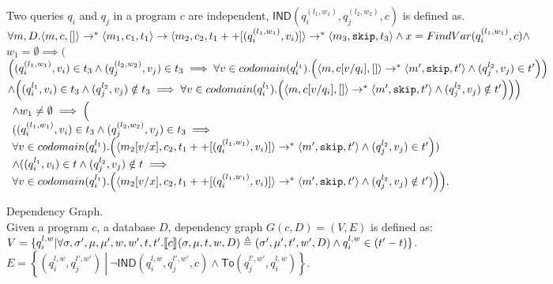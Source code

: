 \documentclass[a4paper,11pt]{article}
\begin{document}
\begin{defn}
Two queries $q_i$ and $q_j$ in a program $c$ are independent,
$\mathsf{IND}(q^{(l_1, w_1)}_i, q^{(l_2, w_2)}_j, c)$ is defined as. \\
$ \forall m, D. \langle m, c,  [] \rangle \rightarrow^{*} \langle m_1, c_1,
  t_1 \rangle \rightarrow \langle m_2, c_2,
  t_1++[(q^{(l_1, w_1)}_i, v_i)] \rangle \rightarrow^{*} \langle m_3, \mathtt{skip},
  t_3 \rangle \land x  = FindVar(q^{(l_1,
  w_1)}_i, c) \land $\\
$w_1 = \emptyset \implies  \Big (
$\\
$ 
\left((q^{(l_1, w_1)}_i, v_i) \in t_3 \land (q^{(l_2, w_2)}_j, v_j) \in t_3  \implies \forall v \in codomain(q^{l_1}_i). 
\left( \config{m, c[v/q_i],  []} \rightarrow^* \config{m', \eskip,  t'} \land (q^{l_2}_j, v_j) \in t'
\right)
\right)$ \\
$ \land
\left( (q^{l_1}_i, v_i) \in t_3 \land (q^{l_2}_j, v_j) \notin t_3  \implies \forall v\in codomain(q^{l_1}_i). 
\left( \config{m, c[v/q_i],  []} \rightarrow^{*} \config{m', \eskip,  t'} \land (q^{l_2}_j, v_j) \notin t'
\right)
\right)
\Big ) $ \\
$\begin{array}{l}
\land {w_1} \not = \emptyset \implies  \Big (  \\
 ( (q^{(l_1, w_1)}_i, v_i) \in t_3 \land (q^{(l_2, w_2)}_j, v_j)
  \in t_3  \implies \\
\forall v \in codomain(q^{l_1}_i). 
\left( \config{m_2[v/x], c_2, t_1++[(q^{(l_1, w_1)}_i, v_i)] } \rightarrow^{*} \config{m', \eskip,  t'}   \land (q^{l_2}_j, v_j) \in t'
\right )
 ) \\
 \land
( (q^{l_1}_i, v_i) \in t \land (q^{l_2}_j, v_j) \notin t
  \implies  \\
 \forall v\in codomain(q^{l_1}_i). 
\left( \config{m_2[v/x], c_2, t_1++[(q^{(l_1, w_1)}_i, v_i)] } \rightarrow^{*} \config{m', \eskip,  t'} \land (q^{l_2}_j, v_j) \notin t'
 )
\right )
\Big ).
\end{array}
$
\end{defn}
%

\begin{defn}
Dependency Graph.
\\
Given a program $c$, a database $D$, dependency graph $G(c,D) = (V, E)$ is defined as: \\
$V =\{q_i^{l,w} |\forall \sigma, \sigma', \mu,\mu' , w, w',t, t'. \llbracket c \rrbracket_{} (\sigma, \mu , t, w, D)  \triangleq  (\sigma' , \mu' , t', w' , D)  \land q_i^{l,w} \in {(t'-t)}  \}$.
\\
$E = \left\{(q_i^{l,w},q_j^{l',w'}) 
~ \left \vert ~ \neg \mathsf{IND}(q_i^{l,w},q_j^{l',w'}, c)
\land \mathsf{To}(q_j^{l',w'}, q_i^{l,w}) \right.\right\}$.
\end{defn}
%
%
%
\end{document}
